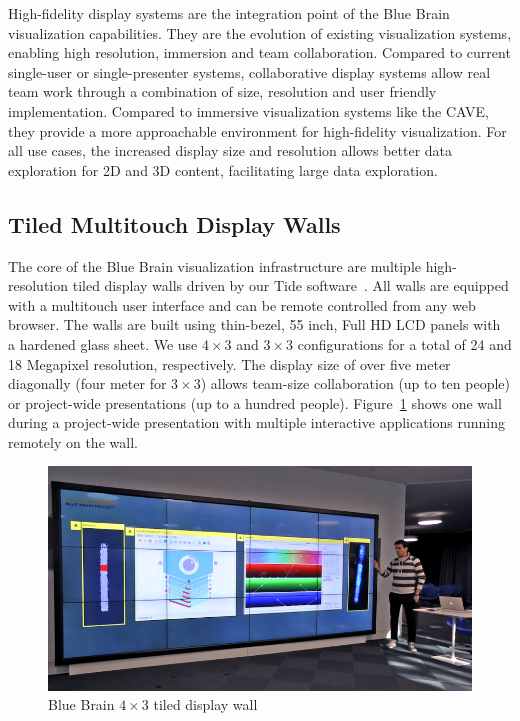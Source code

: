 \documentclass[10pt]{llncs}
\newcommand{\fig}[1]{Figure~\ref{#1}}
\begin{document}
High-fidelity display systems are the integration point of the Blue Brain
visualization capabilities. They are the evolution of existing visualization
systems, enabling high resolution, immersion and team collaboration. Compared
to current single-user or single-presenter systems, collaborative display
systems allow real team work through a combination of size, resolution and user
friendly implementation. Compared to immersive visualization systems like the
CAVE, they provide a more approachable environment for high-fidelity
visualization. For all use cases, the increased display size and resolution
allows better data exploration for 2D and 3D content, facilitating large data
exploration.

\subsection{Tiled Multitouch Display Walls}

The core of the Blue Brain visualization infrastructure are multiple
high-resolution tiled display walls driven by our Tide software~\cite{tide}. All
walls are equipped with a multitouch user interface and can be remote controlled
from any web browser. The walls are built using thin-bezel, 55 inch, Full HD LCD
panels with a hardened glass sheet. We use $4\times 3$ and $3\times 3$
configurations for a total of 24 and 18 Megapixel resolution, respectively. The
display size of over five meter diagonally (four meter for $3\times 3$) allows
team-size collaboration (up to ten people) or project-wide presentations (up to
a hundred people). \fig{fTDW} shows one wall during a project-wide presentation
with multiple interactive applications running remotely on the wall.

\begin{figure}[h!t]
  \includegraphics[width=\columnwidth]{images/tdw}
  \caption{\label{fTDW}Blue Brain $4\times 3$ tiled display wall}
\end{figure}
\end{document}
